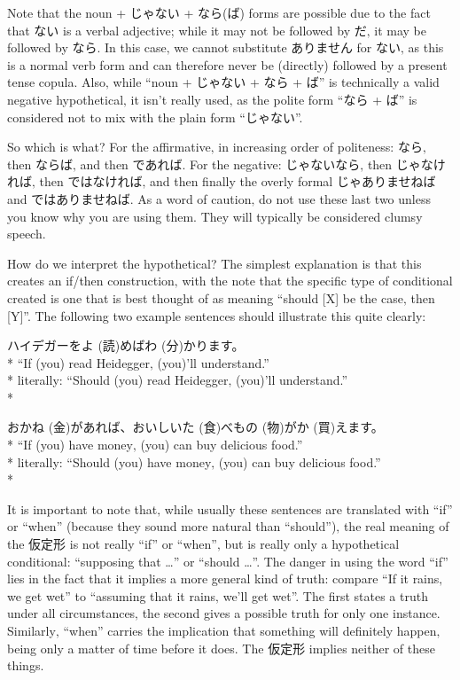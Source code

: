 \documentclass[11pt, b5paper, twoside, openright, onecolumn]{book}
\makeatletter
\newcommand*{\rubystack}[2]{{\relscale{0.5}%
  \begin{tabular}[b]{@{}c@{}}%
    {#1}\\%
   {\textscale{2}{#2}}%
  \end{tabular}}%
}
\DeclareRobustCommand*{\ruby}[2]{%
  \mbox{%
    \setlength{\parskip}{0ex}%
    \BeginAccSupp{method=pdfstringdef,ActualText={#1}}%
      \rubystack{\phantom{#2}}{#1}%
      \llap{%
        \rubystack{#2}{\phantom{#1}}%
      }%
    \EndAccSupp{}%
  }%
}
\renewcommand*{\ruby}[2]{#2 (#1)}%
\newenvironment{exampleblock}{
\setlength{\parindent}{0.6in}
\begin{minipage}[t]{\dimexpr\textwidth-\parindent}}
{\end{minipage}}
\makeatother
\begin{document}
Note that the noun + じゃない + なら(ば) forms are possible due to the fact that ない is a verbal adjective; while it may not be followed by だ‚ it may be followed by なら. In this case‚ we cannot substitute ありません for ない‚ as this is a normal verb form and can therefore never be (directly) followed by a present tense copula. Also‚ while “noun + じゃない + なら + ば” is technically a valid negative hypothetical‚ it isn’t really used‚ as the polite form “なら + ば” is considered not to mix with the plain form “じゃない”.

So which is what? For the affirmative‚ in increasing order of politeness: なら‚ then ならば‚ and then であれば. For the negative: じゃないなら‚ then じゃなければ‚ then ではなければ‚ and then finally the overly formal じゃありませねば and ではありませねば. As a word of caution‚ do not use these last two unless you know why you are using them. They will typically be considered clumsy speech.

How do we interpret the hypothetical? The simplest explanation is that this creates an if/then construction‚ with the note that the specific type of conditional created is one that is best thought of as meaning “should [X] be the case‚ then [Y]”. The following two example sentences should illustrate this quite clearly:

\vspace{0.4cm}
\begin{exampleblock}
ハイデガーを\ruby{読}{よ}めば\ruby{分}{わ}かります。 \\* 
“If (you) read Heidegger‚ (you)’ll understand.” \\* 
literally: “Should (you) read Heidegger‚ (you)’ll understand.” \\* 
\end{exampleblock}
\vspace{0.2cm}

\begin{exampleblock}
お\ruby{金}{かね}があれば、おいしい\ruby{食}{た}べ\ruby{物}{もの}が\ruby{買}{か}えます。 \\* 
“If (you) have money‚ (you) can buy delicious food.” \\* 
literally: “Should (you) have money‚ (you) can buy delicious food.” \\* 
\end{exampleblock}
\vspace{0.2cm}

It is important to note that‚ while usually these sentences are translated with “if” or “when” (because they sound more natural than “should”)‚ the real meaning of the 仮定形 is not really “if” or “when”‚ but is really only a hypothetical conditional: “supposing that …” or “should …”. The danger in using the word “if” lies in the fact that it implies a more general kind of truth: compare “If it rains‚ we get wet” to “assuming that it rains‚ we’ll get wet”. The first states a truth under all circumstances‚ the second gives a possible truth for only one instance. Similarly‚ “when” carries the implication that something will definitely happen‚ being only a matter of time before it does. The 仮定形 implies neither of these things.
\end{document}
